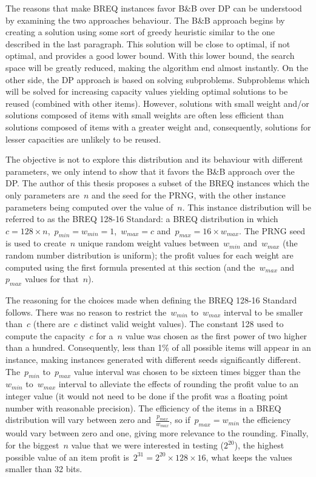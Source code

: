 The reasons that make BREQ instances favor B\&B over DP can be understood by examining the two approaches behaviour.
The B\&B approach begins by creating a solution using some sort of greedy heuristic similar to the one described in the last paragraph.
This solution will be close to optimal, if not optimal, and provides a good lower bound.
With this lower bound, the search space will be greatly reduced, making the algorithm end almost instantly.
On the other side, the DP approach is based on solving subproblems.
Subproblems which will be solved for increasing capacity values yielding optimal solutions to be reused (combined with other items).
However, solutions with small weight and/or solutions composed of items with small weights are often less efficient than solutions composed of items with a greater weight and, consequently, solutions for lesser capacities are unlikely to be reused.

The objective is not to explore this distribution and its behaviour with different parameters, we only intend to show that it favors the B\&B approach over the DP.
The author of this thesis proposes a subset of the BREQ instances which the only parameters are~\(n\) and the seed for the PRNG, with the other instance parameters being computed over the value of~\(n\).
This instance distribution will be referred to as the BREQ 128-16 Standard: a BREQ distribution in which~\(c = 128 \times n\),~\(p_{min} = w_{min} = 1\),~\(w_{max} = c\) and~\(p_{max} = 16 \times w_{max}\).
The PRNG seed is used to create~\(n\) unique random weight values between~\(w_{min}\) and~\(w_{max}\) (the random number distribution is uniform); the profit values for each weight are computed using the first formula presented at this section (and the~\(w_{max}\) and~\(p_{max}\) values for that~\(n\)).

The reasoning for the choices made when defining the BREQ 128-16 Standard follows.
There was no reason to restrict the~\(w_{min}\) to~\(w_{max}\) interval to be smaller than~\(c\) (there are~\(c\) distinct valid weight values).
The constant 128 used to compute the capacity~\(c\) for a~\(n\) value was chosen as the first power of two higher than a hundred.
Consequently, less than 1\% of all possible items will appear in an instance, making instances generated with different seeds significantly different.
The~\(p_{min}\) to~\(p_{max}\) value interval was chosen to be sixteen times bigger than the~\(w_{min}\) to~\(w_{max}\) interval to alleviate the effects of rounding the profit value to an integer value (it would not need to be done if the profit was a floating point number with reasonable precision).
The efficiency of the items in a BREQ distribution will vary between zero and~\(\frac{p_{max}}{w_{max}}\), so if~\(p_{max} = w_{min}\) the efficiency would vary between zero and one, giving more relevance to the rounding.
Finally, for the biggest~\(n\) value that we were interested in testing (\(2^{20}\)), the highest possible value of an item profit is~\(2^{31} = 2^{20}\times128\times16\), what keeps the values smaller than 32 bits.

